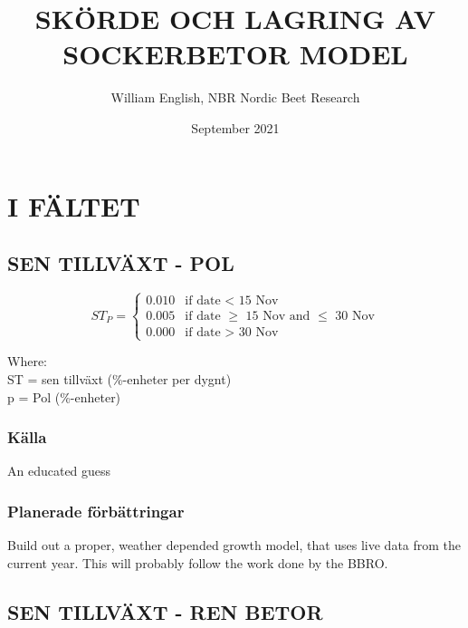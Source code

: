 \documentclass[fleqn]{article}
\title{SKÖRDE OCH LAGRING AV SOCKERBETOR MODEL}
\author{William English, NBR Nordic Beet Research}
\date{September 2021}
\begin{document}


\maketitle

\pagebreak


\section{I FÄLTET}
  
  \subsection{SEN TILLVÄXT - POL}

    \begin{equation}
      ST_P = 
      \begin{cases}
        0.010 & \text{if date < 15 Nov}\\
        0.005 & \text{if date $\geq$ 15 Nov and $\leq$ 30 Nov}\\
        0.000 & \text{if date > 30 Nov}
      \end{cases}
    \end{equation}
    
    Where:\\
    \hangindent=1.5cm
    ST = sen tillväxt (\%-enheter per dygnt)\\
    p = Pol (\%-enheter)

    \subsubsection{Källa}
    An educated guess

    \subsubsection{Planerade förbättringar}
    Build out a proper, weather depended growth model, that uses live data from the current year. This will probably follow the work done by the BBRO.
  
  \subsection{SEN TILLVÄXT - REN BETOR}
\end{document}
